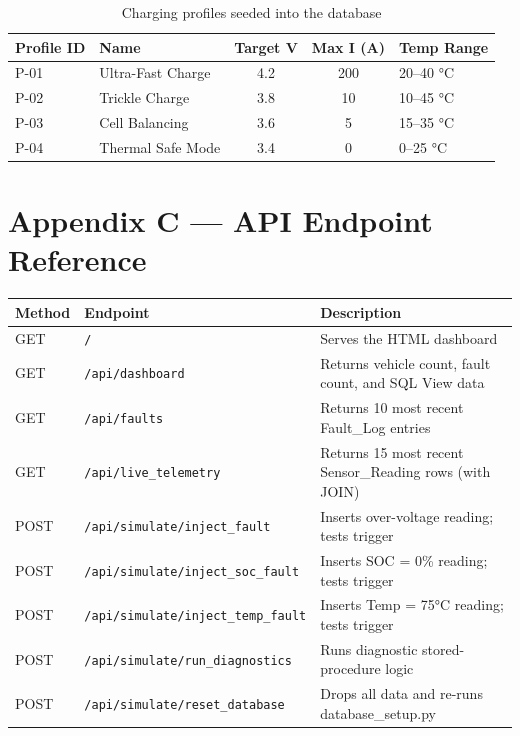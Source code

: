 \documentclass[12pt, a4paper]{report}
\begin{document}
\begin{table}[h]
    \centering
    \caption{Charging profiles seeded into the database}
    \begin{tabular}{@{} l l c c l @{}}
        \toprule
        \textbf{Profile ID} & \textbf{Name} & \textbf{Target V} & \textbf{Max I (A)} & \textbf{Temp Range} \\
        \midrule
        P-01 & Ultra-Fast Charge & 4.2 & 200 & 20--40 °C \\
        P-02 & Trickle Charge    & 3.8 &  10 & 10--45 °C \\
        P-03 & Cell Balancing    & 3.6 &   5 & 15--35 °C \\
        P-04 & Thermal Safe Mode & 3.4 &   0 &  0--25 °C \\
        \bottomrule
    \end{tabular}
    \label{tab:profiles}
\end{table}

\section*{Appendix C — API Endpoint Reference}

\begin{longtable}{@{} l l p{7cm} @{}}
    \toprule
    \textbf{Method} & \textbf{Endpoint} & \textbf{Description} \\
    \midrule
    \endhead
    GET  & \texttt{/}                               & Serves the HTML dashboard \\
    GET  & \texttt{/api/dashboard}                  & Returns vehicle count, fault count, and SQL View data \\
    GET  & \texttt{/api/faults}                     & Returns 10 most recent Fault\_Log entries \\
    GET  & \texttt{/api/live\_telemetry}             & Returns 15 most recent Sensor\_Reading rows (with JOIN) \\
    POST & \texttt{/api/simulate/inject\_fault}      & Inserts over-voltage reading; tests trigger \\
    POST & \texttt{/api/simulate/inject\_soc\_fault} & Inserts SOC = 0\% reading; tests trigger \\
    POST & \texttt{/api/simulate/inject\_temp\_fault}& Inserts Temp = 75°C reading; tests trigger \\
    POST & \texttt{/api/simulate/run\_diagnostics}   & Runs diagnostic stored-procedure logic \\
    POST & \texttt{/api/simulate/reset\_database}    & Drops all data and re-runs database\_setup.py \\
    \bottomrule
\end{longtable}
\end{document}
